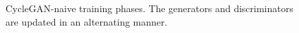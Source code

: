 \begin{figure}[h!]
    \centering
    \caption{CycleGAN-naive training phases. The generators and discriminators are updated in an alternating manner.}
    \label{fig:cyclegan_naive}
\end{figure}{}

